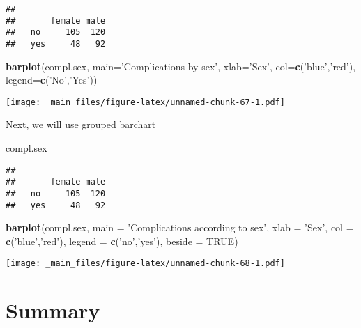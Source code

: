 \documentclass[]{book}
\newenvironment{Shaded}{\begin{snugshade}}{\end{snugshade}}
\newcommand{\KeywordTok}[1]{\textcolor[rgb]{0.13,0.29,0.53}{\textbf{{#1}}}}
\newcommand{\DataTypeTok}[1]{\textcolor[rgb]{0.13,0.29,0.53}{{#1}}}
\newcommand{\StringTok}[1]{\textcolor[rgb]{0.31,0.60,0.02}{{#1}}}
\newcommand{\OtherTok}[1]{\textcolor[rgb]{0.56,0.35,0.01}{{#1}}}
\newcommand{\NormalTok}[1]{{#1}}
\theoremstyle{definition}
\theoremstyle{definition}
\theoremstyle{remark}
\begin{document}
\begin{verbatim}
##      
##       female male
##   no     105  120
##   yes     48   92
\end{verbatim}

\begin{Shaded}
\begin{Highlighting}[]
\KeywordTok{barplot}\NormalTok{(compl.sex,}
        \DataTypeTok{main=}\StringTok{'Complications by sex'}\NormalTok{,}
        \DataTypeTok{xlab=}\StringTok{'Sex'}\NormalTok{,}
        \DataTypeTok{col=}\KeywordTok{c}\NormalTok{(}\StringTok{'blue'}\NormalTok{,}\StringTok{'red'}\NormalTok{),}
        \DataTypeTok{legend=}\KeywordTok{c}\NormalTok{(}\StringTok{'No'}\NormalTok{,}\StringTok{'Yes'}\NormalTok{))}
\end{Highlighting}
\end{Shaded}

\texttt{[image: \_main\_files/figure-latex/unnamed-chunk-67-1.pdf]}

Next, we will use grouped barchart

\begin{Shaded}
\begin{Highlighting}[]
\NormalTok{compl.sex}
\end{Highlighting}
\end{Shaded}

\begin{verbatim}
##      
##       female male
##   no     105  120
##   yes     48   92
\end{verbatim}

\begin{Shaded}
\begin{Highlighting}[]
\KeywordTok{barplot}\NormalTok{(compl.sex,}
        \DataTypeTok{main =} \StringTok{'Complications according to sex'}\NormalTok{,}
        \DataTypeTok{xlab =} \StringTok{'Sex'}\NormalTok{,}
        \DataTypeTok{col =} \KeywordTok{c}\NormalTok{(}\StringTok{'blue'}\NormalTok{,}\StringTok{'red'}\NormalTok{),}
        \DataTypeTok{legend =} \KeywordTok{c}\NormalTok{(}\StringTok{'no'}\NormalTok{,}\StringTok{'yes'}\NormalTok{),}
        \DataTypeTok{beside =} \OtherTok{TRUE}\NormalTok{)}
\end{Highlighting}
\end{Shaded}

\texttt{[image: \_main\_files/figure-latex/unnamed-chunk-68-1.pdf]}

\section{Summary}\label{summary-1}
\end{document}

